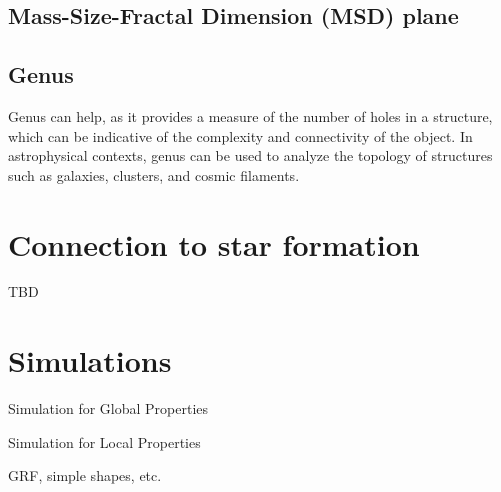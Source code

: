 \subsection{Mass-Size-Fractal Dimension (MSD) plane}


\subsection{Genus}

Genus can help, as it provides a measure of the number of holes in a structure, which can be indicative of the complexity and connectivity of the object. In astrophysical contexts, genus can be used to analyze the topology of structures such as galaxies, clusters, and cosmic filaments.

\section{Connection to star formation}

TBD

\section{Simulations}

Simulation for Global Properties

Simulation for Local Properties 

GRF, simple shapes, etc.